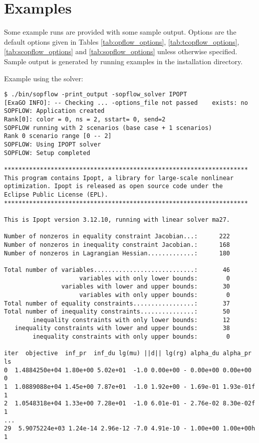 \section{Examples}
Some \sopflow example runs are provided with some sample output. Options are the default options given in Tables \ref{tab:opflow_options}, \ref{tab:tcopflow_options}, \ref{tab:scopflow_options} and \ref{tab:sopflow_options} unless otherwise specified. Sample output is generated by running examples in the installation directory.

Example using the \ipopt solver:

\begin{lstlisting}
$ ./bin/sopflow -print_output -sopflow_solver IPOPT
[ExaGO INFO]: -- Checking ... -options_file not passed    exists: no
SOPFLOW: Application created
Rank[0]: color = 0, ns = 2, sstart= 0, send=2
SOPFLOW running with 2 scenarios (base case + 1 scenarios)
Rank 0 scenario range [0 -- 2]
SOPFLOW: Using IPOPT solver
SOPFLOW: Setup completed

********************************************************************
This program contains Ipopt, a library for large-scale nonlinear 
optimization. Ipopt is released as open source code under the 
Eclipse Public License (EPL).
********************************************************************

This is Ipopt version 3.12.10, running with linear solver ma27.

Number of nonzeros in equality constraint Jacobian...:      222
Number of nonzeros in inequality constraint Jacobian.:      168
Number of nonzeros in Lagrangian Hessian.............:      180

Total number of variables............................:       46
                     variables with only lower bounds:        0
                variables with lower and upper bounds:       30
                     variables with only upper bounds:        0
Total number of equality constraints.................:       37
Total number of inequality constraints...............:       50
        inequality constraints with only lower bounds:       12
   inequality constraints with lower and upper bounds:       38
        inequality constraints with only upper bounds:        0

iter  objective  inf_pr  inf_du lg(mu) ||d|| lg(rg) alpha_du alpha_pr  ls
0  1.4884250e+04 1.80e+00 5.02e+01  -1.0 0.00e+00 - 0.00e+00 0.00e+00   0
1  1.0889088e+04 1.45e+00 7.87e+01  -1.0 1.92e+00 - 1.69e-01 1.93e-01f  1
2  1.0548318e+04 1.33e+00 7.28e+01  -1.0 6.01e-01 - 2.76e-02 8.30e-02f  1
...
29  5.9075224e+03 1.24e-14 2.96e-12 -7.0 4.91e-10 - 1.00e+00 1.00e+00h  1


\end{lstlisting}
